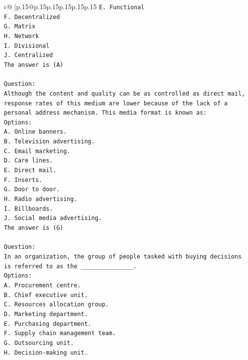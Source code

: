 \documentclass{article}
\begin{document}
{\begin{supertabular}{c@{$\;$}|p{.15\linewidth}@{}p{.15\linewidth}p{.15\linewidth}p{.15\linewidth}p{.15\linewidth}p{.15\linewidth}}
{{{\texttt{E. Functional} \\
\texttt{F. Decentralized} \\
\texttt{G. Matrix} \\
\texttt{H. Network} \\
\texttt{I. Divisional} \\
\texttt{J. Centralized} \\
\texttt{The answer is (A)} \\
\\ 
\texttt{Question:} \\
\texttt{Although the content and quality can be as controlled as direct mail, response rates of this medium are lower because of the lack of a personal address mechanism. This media format is known as:} \\
\texttt{Options:} \\
\texttt{A. Online banners.} \\
\texttt{B. Television advertising.} \\
\texttt{C. Email marketing.} \\
\texttt{D. Care lines.} \\
\texttt{E. Direct mail.} \\
\texttt{F. Inserts.} \\
\texttt{G. Door to door.} \\
\texttt{H. Radio advertising.} \\
\texttt{I. Billboards.} \\
\texttt{J. Social media advertising.} \\
\texttt{The answer is (G)} \\
\\ 
\texttt{Question:} \\
\texttt{In an organization, the group of people tasked with buying decisions is referred to as the \_\_\_\_\_\_\_\_\_\_\_\_\_\_\_.} \\
\texttt{Options:} \\
\texttt{A. Procurement centre.} \\
\texttt{B. Chief executive unit.} \\
\texttt{C. Resources allocation group.} \\
\texttt{D. Marketing department.} \\
\texttt{E. Purchasing department.} \\
\texttt{F. Supply chain management team.} \\
\texttt{G. Outsourcing unit.} \\
\texttt{H. Decision{-}making unit.} \\
}}}
\end{supertabular}}
\end{document}
